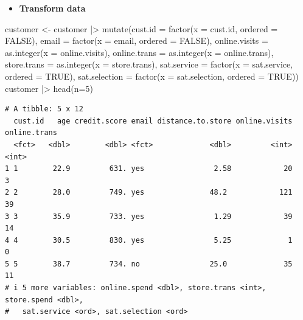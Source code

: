 \documentclass[
  ignorenonframetext,
]{beamer}
\newenvironment{Shaded}{\begin{snugshade}}{\end{snugshade}}
\newcommand{\AttributeTok}[1]{\textcolor[rgb]{0.40,0.45,0.13}{#1}}
\newcommand{\ConstantTok}[1]{\textcolor[rgb]{0.56,0.35,0.01}{#1}}
\newcommand{\DecValTok}[1]{\textcolor[rgb]{0.68,0.00,0.00}{#1}}
\newcommand{\FunctionTok}[1]{\textcolor[rgb]{0.28,0.35,0.67}{#1}}
\newcommand{\NormalTok}[1]{\textcolor[rgb]{0.00,0.23,0.31}{#1}}
\newcommand{\OtherTok}[1]{\textcolor[rgb]{0.00,0.23,0.31}{#1}}
\newcommand{\SpecialCharTok}[1]{\textcolor[rgb]{0.37,0.37,0.37}{#1}}
\providecommand{\tightlist}{%
  \setlength{\itemsep}{0pt}\setlength{\parskip}{0pt}}\usepackage{longtable,booktabs,array}
\begin{document}
\begin{frame}[fragile]{}
\label{section-5}
\begin{itemize}
\tightlist
\item
  \textbf{Transform data}
\end{itemize}

\tiny

\begin{Shaded}
\begin{Highlighting}[]
\NormalTok{customer }\OtherTok{\textless{}{-}}\NormalTok{ customer }\SpecialCharTok{|\textgreater{}}
  \FunctionTok{mutate}\NormalTok{(}\AttributeTok{cust.id =} \FunctionTok{factor}\NormalTok{(}\AttributeTok{x =}\NormalTok{ cust.id, }\AttributeTok{ordered =} \ConstantTok{FALSE}\NormalTok{),}
         \AttributeTok{email =} \FunctionTok{factor}\NormalTok{(}\AttributeTok{x =}\NormalTok{ email, }\AttributeTok{ordered =} \ConstantTok{FALSE}\NormalTok{),}
         \AttributeTok{online.visits =} \FunctionTok{as.integer}\NormalTok{(}\AttributeTok{x =}\NormalTok{ online.visits),}
         \AttributeTok{online.trans =} \FunctionTok{as.integer}\NormalTok{(}\AttributeTok{x =}\NormalTok{ online.trans),}
         \AttributeTok{store.trans =} \FunctionTok{as.integer}\NormalTok{(}\AttributeTok{x =}\NormalTok{ store.trans),}
         \AttributeTok{sat.service =} \FunctionTok{factor}\NormalTok{(}\AttributeTok{x =}\NormalTok{ sat.service, }\AttributeTok{ordered =} \ConstantTok{TRUE}\NormalTok{),}
         \AttributeTok{sat.selection =} \FunctionTok{factor}\NormalTok{(}\AttributeTok{x =}\NormalTok{ sat.selection, }\AttributeTok{ordered =} \ConstantTok{TRUE}\NormalTok{))}
\NormalTok{customer }\SpecialCharTok{|\textgreater{}} \FunctionTok{head}\NormalTok{(}\AttributeTok{n=}\DecValTok{5}\NormalTok{)}
\end{Highlighting}
\end{Shaded}

\begin{verbatim}
# A tibble: 5 x 12
  cust.id   age credit.score email distance.to.store online.visits online.trans
  <fct>   <dbl>        <dbl> <fct>             <dbl>         <int>        <int>
1 1        22.9         631. yes                2.58            20            3
2 2        28.0         749. yes               48.2            121           39
3 3        35.9         733. yes                1.29            39           14
4 4        30.5         830. yes                5.25             1            0
5 5        38.7         734. no                25.0             35           11
# i 5 more variables: online.spend <dbl>, store.trans <int>, store.spend <dbl>,
#   sat.service <ord>, sat.selection <ord>
\end{verbatim}
\end{frame}
\end{document}
